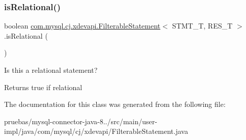 \subsubsection{\texorpdfstring{is\+Relational()}{isRelational()}}
{\footnotesize\ttfamily boolean \mbox{\hyperlink{classcom_1_1mysql_1_1cj_1_1xdevapi_1_1_filterable_statement}{com.\+mysql.\+cj.\+xdevapi.\+Filterable\+Statement}}$<$ S\+T\+M\+T\+\_\+T, R\+E\+S\+\_\+T $>$.is\+Relational (\begin{DoxyParamCaption}{ }\end{DoxyParamCaption})}

Is this a relational statement?

\begin{DoxyReturn}{Returns}
true if relational 
\end{DoxyReturn}


The documentation for this class was generated from the following file\+:\begin{DoxyCompactItemize}
\item 
pruebas/mysql-\/connector-\/java-\/8../src/main/user-\/impl/java/com/mysql/cj/xdevapi/Filterable\+Statement.\+java\end{DoxyCompactItemize}
